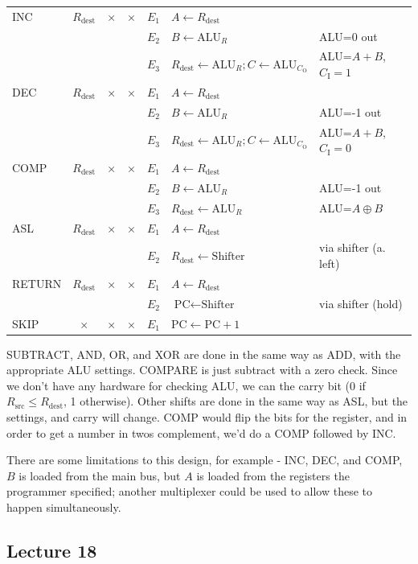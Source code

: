 \documentclass[a4paper, 12pt]{article}
\begin{document}
\begin{center}
\begin{tabular}{l||c|c|c||c|l|l}
                    \hline
                    INC & $R_\text{dest}$ & $\times$ & $\times$ & $E_1$ & $A \leftarrow R_\text{dest}$ & \\
                    & & & & $E_2$ & $B \leftarrow \text{ALU}_R$ & ALU=0 out \\
                    & & & & $E_3$ & $R_\text{dest} \leftarrow \text{ALU}_R; C \leftarrow \text{ALU}_{C_\text{O}}$ & ALU=$A+B$, $C_\text{I} = 1$ \\
                    \hline
                    DEC & $R_\text{dest}$ & $\times$ & $\times$ & $E_1$ & $A \leftarrow R_\text{dest}$ & \\
                    & & & & $E_2$ & $B \leftarrow \text{ALU}_R$ & ALU=-1 out \\
                    & & & & $E_3$ & $R_\text{dest} \leftarrow \text{ALU}_R; C \leftarrow \text{ALU}_{C_\text{O}}$ & ALU=$A+B$, $C_\text{I} = 0$ \\
                    \hline
                    COMP & $R_\text{dest}$ & $\times$ & $\times$ & $E_1$ & $A \leftarrow R_\text{dest}$ & \\
                    & & & & $E_2$ & $B \leftarrow \text{ALU}_R$ & ALU=-1 out \\
                    & & & & $E_3$ & $R_\text{dest} \leftarrow \text{ALU}_R$ & ALU=$A \oplus B$ \\
                    \hline
                    ASL & $R_\text{dest}$ & $\times$ & $\times$ & $E_1$ & $A \leftarrow R_\text{dest}$ & \\
                    & & & & $E_2$ & $R_\text{dest} \leftarrow \text{Shifter}$ & via shifter (a. left) \\
                    \hline
                    RETURN & $R_\text{dest}$ & $\times$ & $\times$ & $E_1$ & $A \leftarrow R_\text{dest}$ & \\
                    & & & & $E_2$ & $\text{PC} \leftarrow \text{Shifter}$ & via shifter (hold) \\
                    \hline
                    SKIP & $\times$ & $\times$ & $\times$ & $E_1$ & $\text{PC} \leftarrow \text{PC} + 1$ & \\
                    \hline
                \end{tabular}
            \end{center}
            SUBTRACT, AND, OR, and XOR are done in the same way as ADD, with the appropriate ALU settings. COMPARE is just subtract with a zero check. Since we don't have any hardware for checking ALU, we can the carry bit (0 if $R_\text{src} \leq R_\text{dest}$, 1 otherwise). Other shifts are done in the same way as ASL, but the settings, and carry will change. COMP would flip the bits for the register, and in order to get a number in twos complement, we'd do a COMP followed by INC.
            \medskip

            There are some limitations to this design, for example - INC, DEC, and COMP, $B$ is loaded from the main bus, but $A$ is loaded from the registers the programmer specified; another multiplexer could be used to allow these to happen simultaneously.
        \subsection*{Lecture 18}
\end{document}
